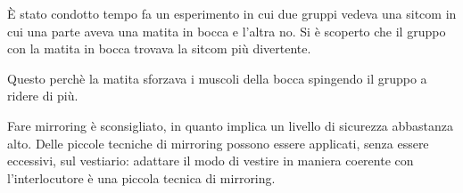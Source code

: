 \begin{example}
È stato condotto tempo fa un esperimento in cui due gruppi vedeva una sitcom
in cui una parte aveva una matita in bocca e l'altra no. Si è scoperto che il
gruppo con la matita in bocca trovava la sitcom più divertente.

\noindent Questo perchè la matita sforzava i muscoli della bocca spingendo il
gruppo a ridere di più.
\end{example}

 Fare mirroring è
sconsigliato, in quanto implica un livello di sicurezza abbastanza alto. Delle
piccole tecniche di mirroring possono essere applicati, senza essere eccessivi,
sul vestiario: adattare il modo di vestire in maniera coerente con
l'interlocutore è una piccola tecnica di mirroring.
